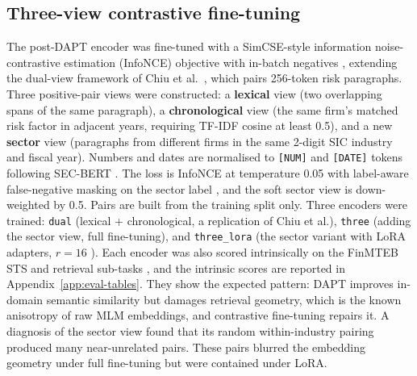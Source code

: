 \documentclass[logo,msc,ai]{infthesis}        %
\begin{document}
\subsection{Three-view contrastive fine-tuning}
The post-DAPT encoder was fine-tuned with a SimCSE-style information noise-contrastive estimation (InfoNCE) objective with in-batch negatives \cite{gao2021simcse}, extending the dual-view framework of Chiu et al.\ \cite{chiu2025financial}, which pairs 256-token risk paragraphs. Three positive-pair views were constructed: a \textbf{lexical} view (two overlapping spans of the same paragraph), a \textbf{chronological} view (the same firm's matched risk factor in adjacent years, requiring TF-IDF cosine at least 0.5), and a new \textbf{sector} view (paragraphs from different firms in the same 2-digit SIC industry and fiscal year). Numbers and dates are normalised to \texttt{[NUM]} and \texttt{[DATE]} tokens following SEC-BERT \cite{loukas2022finer}. The loss is InfoNCE at temperature 0.05 \cite{gao2021simcse} with label-aware false-negative masking on the sector label \cite{khosla2020supervised}, and the soft sector view is down-weighted by 0.5. Pairs are built from the training split only. Three encoders were trained: \texttt{dual} (lexical + chronological, a replication of Chiu et al.), \texttt{three} (adding the sector view, full fine-tuning), and \texttt{three\_lora} (the sector variant with LoRA adapters, $r=16$ \cite{hu2022lora}). Each encoder was also scored intrinsically on the FinMTEB STS and retrieval sub-tasks \cite{tang-yang-2025-finmteb}, and the intrinsic scores are reported in Appendix~\ref{app:eval-tables}. They show the expected pattern: DAPT improves in-domain semantic similarity but damages retrieval geometry, which is the known anisotropy of raw MLM embeddings, and contrastive fine-tuning repairs it. A diagnosis of the sector view found that its random within-industry pairing produced many near-unrelated pairs. These pairs blurred the embedding geometry under full fine-tuning but were contained under LoRA.
\end{document}
